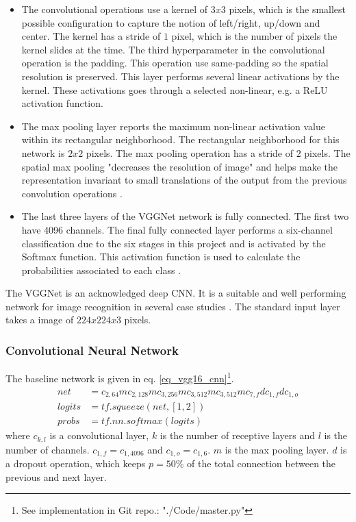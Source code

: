 \begin{itemize}
\item The convolutional operations use a kernel of $3x3$ pixels, which is the smallest possible configuration to capture the notion of left/right, up/down and center. The kernel has a stride of $1$ pixel, which is the number of pixels the kernel slides at the time.
The third hyperparameter in the convolutional operation is the padding. This operation use same-padding so the spatial resolution is preserved. This layer performs several linear activations by the kernel. These activations goes through a selected non-linear, e.g. a ReLU activation function.
\item The max pooling layer reports the maximum non-linear activation value within its rectangular neighborhood. The rectangular neighborhood for this network is $2x2$ pixels. The max pooling operation has a stride of $2$ pixels. The spatial max pooling "decreases the resolution of image" and helps make the representation invariant to small translations of the output from the previous convolution operations \cite[sec. 9]{dl_book}.
	\item The last three layers of the VGGNet network is fully connected. The first two have 4096 channels. The final fully connected layer performs a six-channel classification due to the six stages in this project and is activated by the Softmax function. This activation function is used to calculate the probabilities associated to each class \cite[eq. 4.1]{dl_book}.  
\end{itemize}
The VGGNet is an acknowledged deep CNN. It is a suitable and well performing network for image recognition in several case studies \cite{VGGnet16, stand_cnn_notes}.  
The standard input layer takes a image of $224x224x3$ pixels.


\subsubsection{Convolutional Neural Network}

The baseline network is given in eq. \ref{eq_vgg16_cnn}\footnote{See implementation in Git repo.: "./Code/master.py"}. 
\begin{equation}
\begin{aligned}
net &= c_{2,64}mc_{2,128}mc_{3,256}mc_{3,512}mc_{3,512}m c_{7,f} d c_{1, f} dc_{1,o}	\\
logits &= tf.squeeze(net, [1, 2])\\
probs &= tf.nn.softmax(logits)
\end{aligned}
\label{eq_vgg16_cnn}
\end{equation}
where $c_{k,l}$ is a convolutional layer, $k$ is the number of receptive layers and $l$ is the number of channels. $c_{1,f} = c_{1,4096}$ and $c_{1,o} = c_{1,6}$.
$m$ is the max pooling layer. $d$ is a dropout operation, which keeps  $p = 50\%$ of the total connection between the previous and next layer. 


